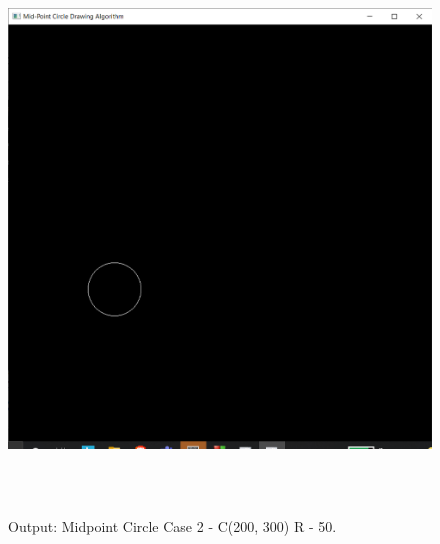 \documentclass[12pt, a4]{article}
\begin{document}
\subsection*{}
\begin{figure}[h]
\centering
\caption{Output: Midpoint Circle Case 2 - C(200, 300) R - 50.}
\includegraphics[height=15cm, width=15cm]{MidpointCircle/Outputs/Circle-2.png}
\end{figure}

\newpage
\subsection*{}
\begin{flushleft}

\end{flushleft}

\newpage
\end{document}
